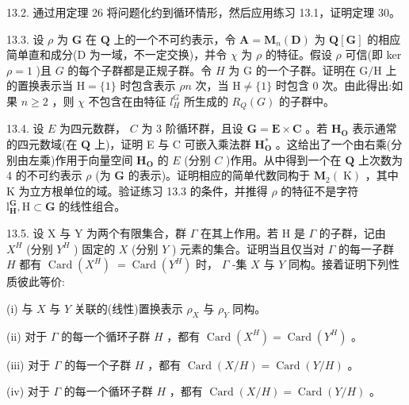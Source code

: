 \documentclass[10pt]{article}
\begin{document}
13.2. 通过用定理 26 将问题化约到循环情形，然后应用练习 13.1，证明定理 30。

13.3. 设 \(\rho\) 为 \(\mathbf{G}\) 在 \(\mathbf{Q}\) 上的一个不可约表示，令 \(\mathbf{A} = {\mathbf{M}}_{n}\left( \mathbf{D}\right)\) 为 \(\mathbf{Q}\left\lbrack  \mathbf{G}\right\rbrack\) 的相应简单直和成分(D 为一域，不一定交换)，并令 \(\chi\) 为 \(\rho\) 的特征。假设 \(\rho\) 可信(即 ker \(\rho  = 1\) )且 \(G\) 的每个子群都是正规子群。令 \(H\) 为 G 的一个子群。证明在 \(\mathrm{G}/\mathrm{H}\) 上的置换表示当 \(\mathrm{H} = \{ 1\}\) 时包含表示 \({\rho n}\) 次，当 \(\mathrm{H} \neq  \{ 1\}\) 时包含 0 次。由此得出:如果 \(n \geq  2\) ，则 \(\chi\) 不包含在由特征 \({l}_{H}^{G}\) 所生成的 \({R}_{Q}\left( G\right)\) 的子群中。

13.4. 设 \(E\) 为四元数群， \(C\) 为 3 阶循环群，且设 \(\mathbf{G} = \mathbf{E} \times  \mathbf{C}\) 。若 \({\mathbf{H}}_{\mathbf{O}}\) 表示通常的四元数域(在 \(\mathbf{Q}\) 上)，证明 E 与 \(\mathrm{C}\) 可嵌入乘法群 \({\mathbf{H}}_{\mathbf{O}}^{ * }\) 。这给出了一个由右乘(分别由左乘)作用于向量空间 \({\mathbf{H}}_{\mathbf{O}}\) 的 \(E\) (分别 \(C\) )作用。从中得到一个在 \(\mathbf{Q}\) 上次数为 4 的不可约表示 \(\rho\) (为 \(\mathbf{G}\) 的表示)。证明相应的简单代数同构于 \({\mathbf{M}}_{2}\left( \mathrm{\;K}\right)\) ，其中 \(\mathrm{K}\) 为立方根单位的域。验证练习 13.3 的条件，并推得 \(\rho\) 的特征不是字符 \({\mathrm{l}}_{\mathbf{H}}^{\mathbf{G}},\mathrm{H} \subset  \mathbf{G}\) 的线性组合。

13.5. 设 \(\mathrm{X}\) 与 \(\mathrm{Y}\) 为两个有限集合，群 \(\Gamma\) 在其上作用。若 \(\mathrm{H}\) 是 \(\Gamma\) 的子群，记由 \({X}^{H}\) (分别 \({Y}^{H}\) ) 固定的 \(X\) (分别 \(Y\) ) 元素的集合。证明当且仅当对 \(\Gamma\) 的每一子群 \(H\) 都有 \(\operatorname{Card}\left( {X}^{H}\right) \; = \operatorname{Card}\left( {Y}^{H}\right)\) 时， \(\Gamma\) -集 \(X\) 与 \(Y\) 同构。接着证明下列性质彼此等价:

(i) 与 \(X\) 与 \(Y\) 关联的(线性)置换表示 \({\rho }_{X}\) 与 \({\rho }_{Y}\) 同构。

(ii) 对于 \(\Gamma\) 的每一个循环子群 \(H\) ，都有 \(\operatorname{Card}\left( {X}^{H}\right)  = \operatorname{Card}\left( {Y}^{H}\right)\) 。

(iii) 对于 \(\Gamma\) 的每一个子群 \(H\) ，都有 \(\operatorname{Card}\left( {X/H}\right)  = \operatorname{Card}\left( {Y/H}\right)\) 。

(iv) 对于 \(\Gamma\) 的每一个循环子群 \(H\) ，都有 \(\operatorname{Card}\left( {X/H}\right)  = \operatorname{Card}\left( {Y/H}\right)\) 。
\end{document}

